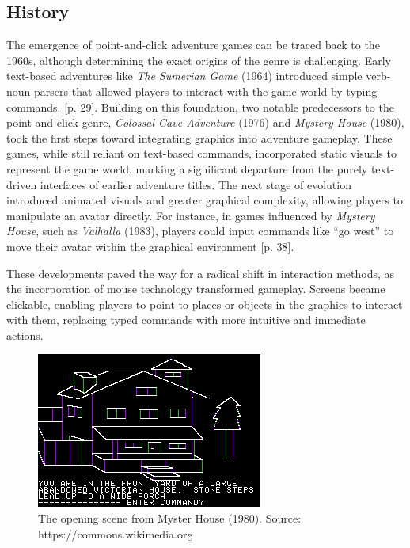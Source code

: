 \subsection{History}
The emergence of point-and-click adventure games can be traced back to the 1960s, although determining the exact origins of the genre is challenging. Early text-based adventures like \textit{The Sumerian Game} (1964) introduced simple verb-noun parsers that allowed players to interact with the game world by typing commands. \cite{Salter2014}[p. 29].  Building on this foundation, two notable predecessors to the point-and-click genre, \textit{Colossal Cave Adventure} (1976) and \textit{Mystery House} (1980), took the first steps toward integrating graphics into adventure gameplay. These games, while still reliant on text-based commands, incorporated static visuals to represent the game world, marking a significant departure from the purely text-driven interfaces of earlier adventure titles. The next stage of evolution introduced animated visuals and greater graphical complexity, allowing players to manipulate an avatar directly. For instance, in games influenced by \textit{Mystery House}, such as \textit{Valhalla} (1983), players could input commands like “go west” to move their avatar within the graphical environment \cite{Salter2014}[p. 38]. 

These developments paved the way for a radical shift in interaction methods, as the incorporation of mouse technology transformed gameplay. Screens became clickable, enabling players to point to places or objects in the graphics to interact with them, replacing typed commands with more intuitive and immediate actions.


\begin{figure}
\centering
\includegraphics{img/Mystery_House.png}
\caption{The opening scene from Myster House (1980). Source: https://commons.wikimedia.org\cite{wiki:MysteryHouse}}
\label{fig:g}
\end{figure}

